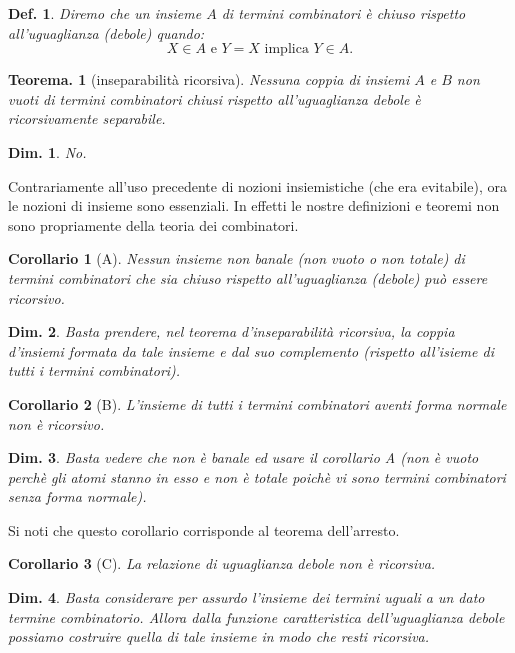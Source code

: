 \documentclass{book}
\newtheorem{definizione}{Def.}[chapter]
\newtheorem{teorema}{Teorema.}[chapter]
\newtheorem{dimostrazione}{Dim.}[chapter]
\newtheorem{corollario}{Corollario}[chapter]
\begin{document}
\begin{definizione}
Diremo che un insieme $A$ di termini combinatori \`e \emph{chiuso rispetto 
all'uguaglianza (debole)} quando:
\[
X \in A \text{ e } Y = X \text{ implica } Y \in A.
\]
\end{definizione}

\begin{teorema}[inseparabilit\`a ricorsiva]
Nessuna coppia di insiemi $A$ e $B$ non vuoti di termini combinatori chiusi
rispetto all'uguaglianza debole \`e ricorsivamente separabile.
\end{teorema}
\begin{dimostrazione}
No.
\end{dimostrazione}
Contrariamente all'uso precedente di nozioni insiemistiche (che era evitabile),
ora le nozioni di insieme sono essenziali. In effetti le nostre definizioni e 
teoremi non sono propriamente della teoria dei combinatori.

\begin{corollario}[A]
Nessun insieme non banale (non vuoto o non totale) di termini combinatori che
sia chiuso rispetto all'uguaglianza (debole) pu\`o essere ricorsivo.
\end{corollario}

\begin{dimostrazione}
Basta prendere, nel teorema d'inseparabilit\`a ricorsiva, la coppia d'insiemi
formata da tale insieme e dal suo complemento (rispetto all'isieme di tutti i
termini combinatori).
\end{dimostrazione}

\begin{corollario}[B]
L'insieme di tutti i termini combinatori aventi forma normale non \`e 
ricorsivo.
\end{corollario}

\begin{dimostrazione}
Basta vedere che non \`e banale ed usare il corollario A (non \`e vuoto 
perch\`e gli atomi stanno in esso e non \`e totale poich\`e vi sono termini
combinatori senza forma normale).
\end{dimostrazione}
Si noti che questo corollario corrisponde al teorema dell'arresto.

\begin{corollario}[C]
La relazione di uguaglianza debole non \`e ricorsiva.
\end{corollario}

\begin{dimostrazione}
Basta considerare per assurdo l'insieme dei termini uguali a un dato termine
combinatorio. Allora dalla funzione caratteristica dell'uguaglianza debole 
possiamo costruire quella di tale insieme in modo che resti ricorsiva.
\end{dimostrazione}
\end{document}

